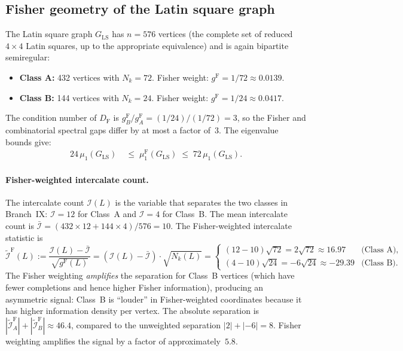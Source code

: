 \documentclass[11pt]{article}
\newcommand{\gF}{g^{\mathrm{F}}}
\theoremstyle{remark}
\begin{document}
\subsection{Fisher geometry of the Latin square graph}

The Latin square graph $G_{\mathrm{LS}}$ has $n = 576$ vertices (the complete
set of reduced $4 \times 4$ Latin squares, up to the appropriate equivalence)
and is again bipartite semiregular:
\begin{itemize}
  \item \textbf{Class A:} 432 vertices with $N_k = 72$.
  Fisher weight: $\gF = 1/72 \approx 0.0139$.
  \item \textbf{Class B:} 144 vertices with $N_k = 24$.
  Fisher weight: $\gF = 1/24 \approx 0.0417$.
\end{itemize}

The condition number of $D_{\mathrm{F}}$ is $\gF_B/\gF_A = (1/24)/(1/72) = 3$,
so the Fisher and combinatorial spectral gaps differ by at most a factor of~$3$.
The eigenvalue bounds give:
\begin{align*}
24\, \mu_1(G_{\mathrm{LS}})
&\;\le\; \mu_1^{\mathrm{F}}(G_{\mathrm{LS}})
\;\le\; 72\, \mu_1(G_{\mathrm{LS}}).
\end{align*}

\paragraph{Fisher-weighted intercalate count.}
The intercalate count $\mathcal{I}(L)$ is the variable that separates the two
classes in Branch~IX: $\mathcal{I} = 12$ for Class~A and $\mathcal{I} = 4$ for
Class~B.  The mean intercalate count is
$\bar{\mathcal{I}} = (432 \times 12 + 144 \times 4)/576 = 10$.  The
Fisher-weighted intercalate statistic is
\[
\tilde{\mathcal{I}}^{\mathrm{F}}(L) :=
\frac{\mathcal{I}(L) - \bar{\mathcal{I}}}{\sqrt{\gF(L)}}
= (\mathcal{I}(L) - \bar{\mathcal{I}}) \cdot \sqrt{N_k(L)}
= \begin{cases}
(12 - 10)\sqrt{72} = 2\sqrt{72} \approx 16.97 & \text{(Class A)}, \\
(4 - 10)\sqrt{24} = -6\sqrt{24} \approx -29.39 & \text{(Class B)}.
\end{cases}
\]
The Fisher weighting \emph{amplifies} the separation for Class~B vertices
(which have fewer completions and hence higher Fisher information),
producing an asymmetric signal: Class~B is ``louder'' in Fisher-weighted
coordinates because it has higher information density per vertex.  The
absolute separation is
$|\tilde{\mathcal{I}}^{\mathrm{F}}_A| + |\tilde{\mathcal{I}}^{\mathrm{F}}_B|
\approx 46.4$,
compared to the unweighted separation $|2| + |{-}6| = 8$.  Fisher weighting
amplifies the signal by a factor of approximately~$5.8$.
\end{document}
